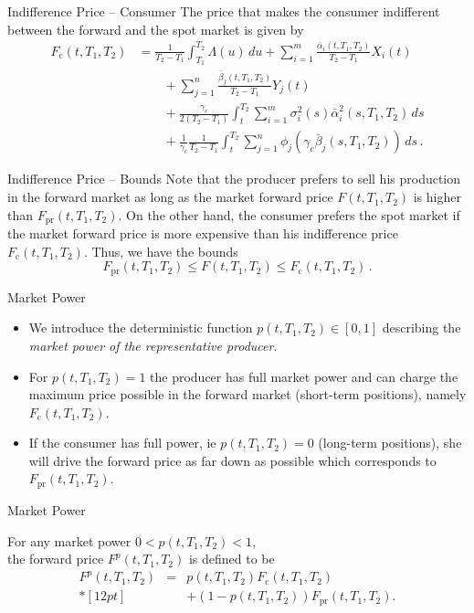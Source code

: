 {Indifference Price -- Consumer}
The price that makes the consumer indifferent between the forward
and the spot market is given by
\begin{align*}
F_{\text{c}}(t,T_1,T_2)&=\frac1{T_2-T_1}\int_{T_1}^{T_2}\Lambda(u)\,du
+\sum_{i=1}^m\frac{\bar{\alpha}_i(t,T_1,T_2)}{T_2-T_1}X_i(t)\\
&\qquad+\sum_{j=1}^n\frac{\bar{\beta}_j(t,T_1,T_2)}{T_2-T_1}Y_j(t) \\
&\qquad+\frac{\gamma_c}{2(T_2-T_1)}\int_t^{T_2}
\sum_{i=1}^m\sigma_i^2(s)\bar{\alpha}_i^2(s,T_1,T_2)\,ds \\
&\qquad+\frac1{\gamma_c}\frac1{T_2-T_1}\int_t^{T_2}\sum_{j=1}^n
\phi_j\left(\gamma_c\bar{\beta}_j(s,T_1,T_2)\right)\,ds\,.
\end{align*}

{Indifference Price -- Bounds}
Note that the producer prefers to sell his production in the forward
market as long as the market forward price $F(t,T_1,T_2)$ is higher
than $F_{\text{pr}}(t,T_1,T_2)$. On the other hand, the consumer
prefers the spot market if the market forward price is more
expensive than his indifference price $F_{\text{c}}(t,T_1,T_2)$.
Thus, we have the bounds
\begin{equation}\label{bounds for forward}
F_{\text{pr}}(t,T_1,T_2)\leq F(t,T_1,T_2)\leq
F_{\text{c}}(t,T_1,T_2)\,.
\end{equation}

{Market Power}
\begin{itemize}
\item<1-> We introduce the deterministic function $p(t,T_1,T_2)\in[0,1]$
describing the \emph{market power of the representative producer}.
\item<2-> For $p(t,T_1,T_2)=1$ the
producer has full market power and can charge the maximum price possible in the forward market (short-term positions),
namely $F_{\text{c}}(t,T_1,T_2)$.
\item<3-> If the
consumer has full power, ie $p(t,T_1,T_2)=0$ (long-term positions), she will drive the
forward price as far down as possible which corresponds to
$F_{\text{pr}}(t,T_1,T_2)$.

\end{itemize}

{Market Power}

For any market power $0<p(t,T_1,T_2)<1$,\\
the forward price $F^p(t,T_1,T_2)$ is defined to be
\begin{eqnarray}
\nonumber
F^p(t,T_1,T_2)&=&p(t,T_1,T_2)F_{\text{c}}(t,T_1,T_2)\\*[12pt]
&&+(1-p(t,T_1,T_2))
F_{\text{pr}}(t,T_1,T_2).
\end{eqnarray}

